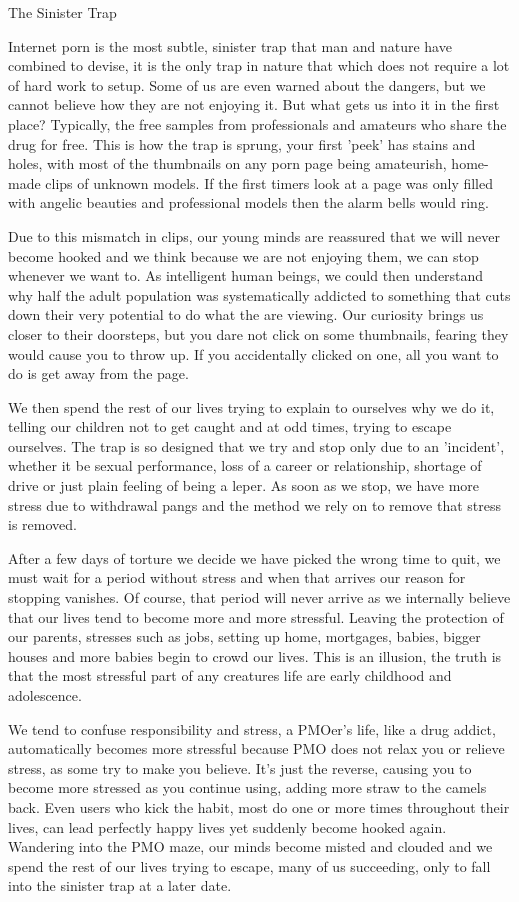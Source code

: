 The Sinister Trap

Internet porn is the most subtle, sinister trap that man and nature have combined to devise, it is the only trap in nature that which does not require a lot of hard work to setup. Some of us are even warned about the dangers, but we cannot believe how they are not enjoying it. But what gets us into it in the first place? Typically, the free samples from professionals and amateurs who share the drug for free. This is how the trap is sprung, your first 'peek' has stains and holes, with most of the thumbnails on any porn page being amateurish, home-made clips of unknown models. If the first timers look at a page was only filled with angelic beauties and professional models then the alarm bells would ring.

Due to this mismatch in clips, our young minds are reassured that we will never become hooked and we think because we are not enjoying them, we can stop whenever we want to.  As intelligent human beings, we could then understand why half the adult population was systematically addicted to something that cuts down their very potential to do what the are viewing. Our curiosity brings us closer to their doorsteps, but you dare not click on some thumbnails, fearing they would cause you to throw up. If you accidentally clicked on one, all you want to do is get away from the page.

We then spend the rest of our lives trying to explain to ourselves why we do it, telling our children not to get caught and at odd times, trying to escape ourselves. The trap is so designed that we try and stop only due to an 'incident', whether it be sexual performance, loss of a career or relationship, shortage of drive or just plain feeling of being a leper. As soon as we stop, we have more stress due to withdrawal pangs and the method we rely on to remove that stress is removed.

After a few days of torture we decide we have picked the wrong time to quit, we must wait for a period without stress and when that arrives our reason for stopping vanishes. Of course, that period will never arrive as we internally believe that our lives tend to become more and more stressful. Leaving the protection of our parents, stresses such as jobs, setting up home, mortgages, babies, bigger houses and more babies begin to crowd our lives. This is an illusion, the truth is that the most stressful part of any creatures life are early childhood and adolescence.

We tend to confuse responsibility and stress, a PMOer's life, like a drug addict, automatically becomes more stressful because PMO does not relax you or relieve stress, as some try to make you believe. It's just the reverse, causing you to become more stressed as you continue using, adding more straw to the camels back. Even users who kick the habit, most do one or more times throughout their lives, can lead perfectly happy lives yet suddenly become hooked again. Wandering into the PMO maze, our minds become misted and clouded and we spend the rest of our lives trying to escape, many of us succeeding, only to fall into the sinister trap at a later date.

